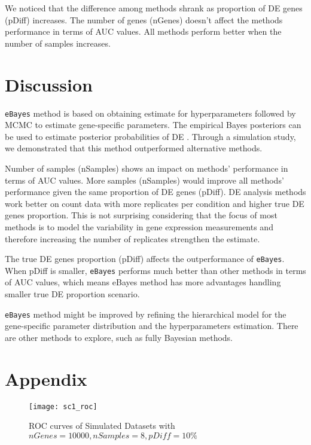 We noticed that the difference among methods shrank as proportion of DE genes (pDiff) increases. The number of genes (nGenes) doesn't affect the methods performance in terms of AUC values. All methods perform better when the number of samples increases.


\section{Discussion}

{\tt eBayes} method is based on obtaining estimate for hyperparameters followed by MCMC to estimate gene-specific parameters. The empirical Bayes posteriors can be used to estimate posterior probabilities of DE . Through a simulation study, we demonstrated that this method outperformed alternative methods. 

Number of samples (nSamples) shows an impact on methods' performance in terms of AUC values. More samples (nSamples) would improve all methods' performance given the same proportion of DE genes (pDiff). DE analysis methods work better on count data with more replicates per condition and higher true DE genes proportion. This is not surprising considering that the focus of most methods is to model the variability in gene expression measurements and therefore increasing the number of replicates strengthen the estimate. 

The true DE genes proportion (pDiff) affects the outperformance of {\tt eBayes}. When pDiff is smaller, {\tt eBayes} performs much better than other methods in terms of AUC values, which means eBayes method has more advantages handling smaller true DE proportion scenario.

{\tt eBayes} method might be improved by refining the hierarchical model for the gene-specific parameter distribution and the hyperparameters estimation. There are other methods to explore, such as fully Bayesian methods. 



\section{Appendix}

\begin{figure}[h!tb] 
\texttt{[image: sc1\_roc]}
\caption{ROC curves of Simulated Datasets with $nGenes=10000, nSamples=8, pDiff=10\%$}
\label{sc1_roc}
\end{figure}



